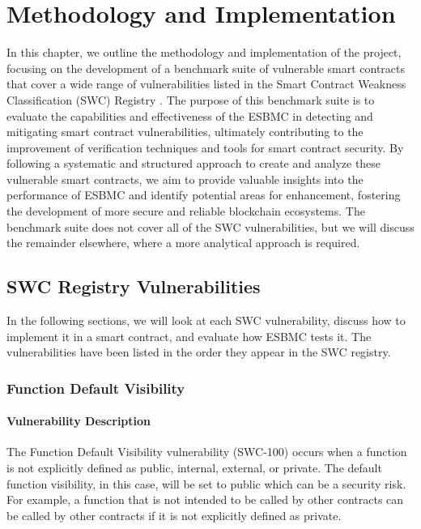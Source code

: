 \chapter{Methodology and Implementation}
\label{cha:methodology_and_implementation}

In this chapter, we outline the methodology and implementation of the project, focusing on the development of a benchmark suite of vulnerable smart contracts that cover a wide range of vulnerabilities listed in the Smart Contract Weakness Classification (SWC) Registry \cite{swc}. The purpose of this benchmark suite is to evaluate the capabilities and effectiveness of the ESBMC in detecting and mitigating smart contract vulnerabilities, ultimately contributing to the improvement of verification techniques and tools for smart contract security. By following a systematic and structured approach to create and analyze these vulnerable smart contracts, we aim to provide valuable insights into the performance of ESBMC and identify potential areas for enhancement, fostering the development of more secure and reliable blockchain ecosystems. The benchmark suite does not cover all of the SWC vulnerabilities, but we will discuss the remainder elsewhere, where a more analytical approach is required.


\section{SWC Registry Vulnerabilities}

In the following sections, we will look at each SWC vulnerability, discuss how to implement it in a smart contract, and evaluate how ESBMC tests it. The vulnerabilities have been listed in the order they appear in the SWC registry. 

\subsection{Function Default Visibility}
\label{sec:default_visibility}

\subsubsection{Vulnerability Description}

The Function Default Visibility vulnerability (SWC-100) occurs when a function is not explicitly defined as public, internal, external, or private. The default function visibility, in this case, will be set to public which can be a security risk. For example, a function that is not intended to be called by other contracts can be called by other contracts if it is not explicitly defined as private.

